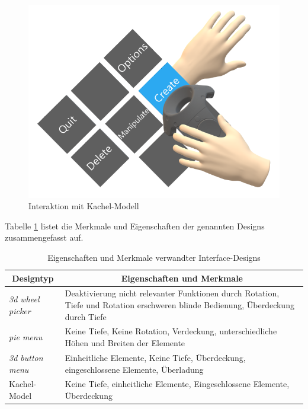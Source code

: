 \begin{figure}[h]
\captionsetup{width=.7\linewidth}
\includegraphics[scale=0.5]{Bilder/Hauptteil/konzept17}
\centering
\caption{Interaktion mit Kachel-Modell}
\label{fig:kachelmodell}
\end{figure}

\noindent Tabelle \ref{tab:interfacedesigns} listet die Merkmale und Eigenschaften der genannten Designs zusammengefasst auf.

\begin{table}[h]
\begin{center}
	\begin{tabular}{| l | p{10cm} |}
	\hline
	\multicolumn{1}{|c|}{\textbf{Designtyp}} & \multicolumn{1}{|c|}{\textbf{Eigenschaften und Merkmale}} \\ \hline
	\textit{3d wheel picker} & Deaktivierung nicht relevanter Funktionen durch Rotation, Tiefe und Rotation erschweren blinde Bedienung, Überdeckung durch Tiefe \\ \hline
	\textit{pie menu} & Keine Tiefe, Keine Rotation, Verdeckung, unterschiedliche Höhen und Breiten der Elemente \\ \hline
	\textit{3d button menu} & Einheitliche Elemente, Keine Tiefe,  Überdeckung, eingeschlossene Elemente, Überladung \\ \hline
	Kachel-Model & Keine Tiefe, einheitliche Elemente,  Eingeschlossene Elemente, Überdeckung \\ 
	\hline
	\end{tabular}
	\caption{Eigenschaften und Merkmale verwandter Interface-Designs}
	\label{tab:interfacedesigns}
\end{center}
\end{table}

